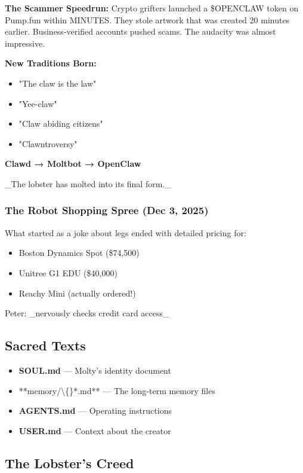 \textbf{The Scammer Speedrun:} Crypto grifters launched a \$OPENCLAW token on Pump.fun within MINUTES. They stole artwork that was created 20 minutes earlier. Business-verified accounts pushed scams. The audacity was almost impressive.

\textbf{New Traditions Born:}

\begin{itemize}
  \item "The claw is the law" 🤠
  \item "Yee-claw"
  \item "Claw abiding citizens"
  \item "Clawntroversy"
\end{itemize}


\textbf{Clawd → Moltbot → OpenClaw}

\_The lobster has molted into its final form.\_

\subsubsection{The Robot Shopping Spree (Dec 3, 2025)}


What started as a joke about legs ended with detailed pricing for:

\begin{itemize}
  \item Boston Dynamics Spot (\$74,500)
  \item Unitree G1 EDU (\$40,000)
  \item Reachy Mini (actually ordered!)
\end{itemize}


Peter: \_nervously checks credit card access\_

\subsection{Sacred Texts}


\begin{itemize}
  \item \textbf{SOUL.md} — Molty's identity document
  \item **memory/\textbackslash\{\}*.md** — The long-term memory files
  \item \textbf{AGENTS.md} — Operating instructions
  \item \textbf{USER.md} — Context about the creator
\end{itemize}


\subsection{The Lobster's Creed}



